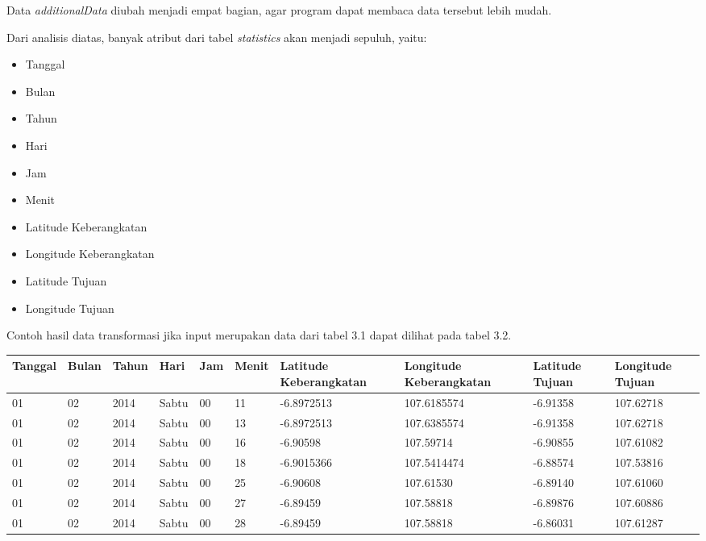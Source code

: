 Data \textsl{additionalData} diubah menjadi empat bagian, agar program dapat membaca data tersebut lebih mudah.

Dari analisis diatas, banyak atribut dari tabel \textsl{statistics} akan menjadi sepuluh, yaitu:
\begin{itemize}
	\item Tanggal
	\item Bulan
	\item Tahun
	\item Hari
	\item Jam
	\item Menit
	\item Latitude Keberangkatan
	\item Longitude Keberangkatan
	\item Latitude Tujuan
	\item Longitude Tujuan
\end{itemize}

Contoh hasil data transformasi jika input merupakan data dari tabel 3.1 dapat dilihat pada tabel 3.2.

\begin{table}[h]
\caption{Contoh hasil data transformasi}
\begin{longtable}{|l|l|l|l|l|l|l|l|l|l|}
\hline
\textbf{Tanggal}	& \textbf{Bulan}	& \textbf{Tahun} 	& \textbf{Hari} & \textbf{Jam}	& \textbf{Menit} & \textbf{Latitude Keberangkatan} & \textbf{Longitude Keberangkatan} & \textbf{Latitude Tujuan} & \textbf{Longitude Tujuan}      \\ \hline
01				         	& 02								& 2014						& Sabtu         & 00         	& 11						 & -6.8972513										 & 107.6185574 							  & -6.91358                & 107.62718 \\ \hline
01				         	& 02								& 2014						& Sabtu         & 00         	& 13						 & -6.8972513										 & 107.6385574                & -6.91358							  & 107.62718 \\ \hline
01				          & 02								& 2014						& Sabtu         & 00         	& 16						 & -6.90598											 & 107.59714     		  				& -6.90855						&107.61082 \\ \hline
01				          & 02								& 2014						& Sabtu         & 00         	& 18						 & -6.9015366										 & 107.5414474 								& -6.88574					    & 107.53816 \\ \hline
01				          & 02								& 2014						& Sabtu         & 00         	& 25						 & -6.90608										   & 107.61530     						  & -6.89140					 &107.61060 \\ \hline
01				          & 02								& 2014						& Sabtu         & 00         	& 27						 & -6.89459											 & 107.58818     							& -6.89876						&107.60886 \\ \hline
01				          & 02								& 2014						& Sabtu         & 00         	& 28						 & -6.89459											 &107.58818  								   & -6.86031					 &107.61287 \\ \hline
\end{longtable}
\end{table} 

